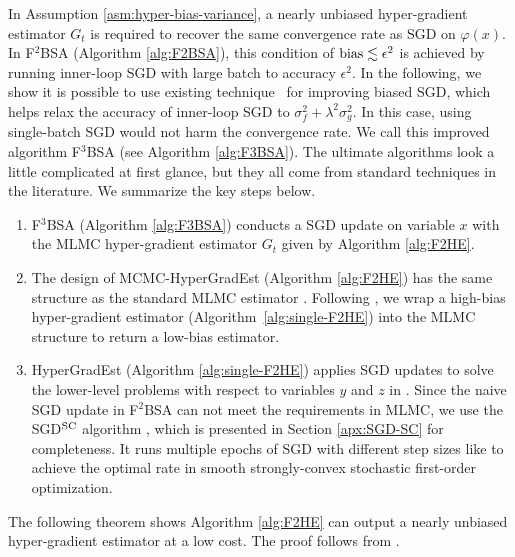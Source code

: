 {In Assumption \ref{asm:hyper-bias-variance}, a nearly unbiased hyper-gradient estimator $G_t$ is required to recover the same convergence rate as SGD on $\varphi(x)$. In F${}^2$BSA (Algorithm \ref{alg:F2BSA}), this condition of ${\rm bias} \lesssim \epsilon^2$ is achieved by running inner-loop SGD with large batch to accuracy $ \epsilon^2$. In the following, we show it is possible to use existing technique~\citep{asi2021stochastic,hu2021bias} for improving biased SGD, which helps relax the accuracy of inner-loop SGD to $ \sigma_f^2 + \lambda^2 \sigma_g^2$. In this case, using single-batch SGD would not harm the convergence rate. We call this improved algorithm F${}^3$BSA (see Algorithm \ref{alg:F3BSA}). The ultimate algorithms look a little complicated at first glance, but they all come from standard techniques in the literature. We summarize the key steps below.
\begin{enumerate}
    \item F${}^3$BSA (Algorithm \ref{alg:F3BSA}) conducts a SGD update on variable $x$ with the MLMC hyper-gradient estimator $G_t$ given by Algorithm \ref{alg:F2HE}.
    \item The design of MCMC-HyperGradEst (Algorithm \ref{alg:F2HE}) has the same structure as the standard MLMC estimator \citep{giles2008multilevel,blanchet2015unbiased}. Following \citep{asi2021stochastic,hu2021bias}, we wrap a high-bias hyper-gradient estimator (Algorithm~\ref{alg:single-F2HE}) into the MLMC structure to return a low-bias estimator. 
    \item HyperGradEst (Algorithm \ref{alg:single-F2HE}) applies SGD updates to solve the lower-level problems with respect to variables $y$ and $z$ in . 
    Since the naive SGD update in F${}^2$BSA can not meet the 
    requirements in MLMC, we use the SGD${}^{
    \rm SC}$ algorithm \citep[Algorithm 2]{allen2018make}, which is presented in Section \ref{apx:SGD-SC} for completeness. It runs multiple epochs of SGD with different step sizes like \citep{hazan2014beyond} to achieve the optimal rate in smooth strongly-convex stochastic first-order optimization.
\end{enumerate}


The following theorem shows Algorithm \ref{alg:F2HE} can output a nearly unbiased hyper-gradient estimator at a low cost. The proof follows from \citep{asi2021stochastic}.

}
